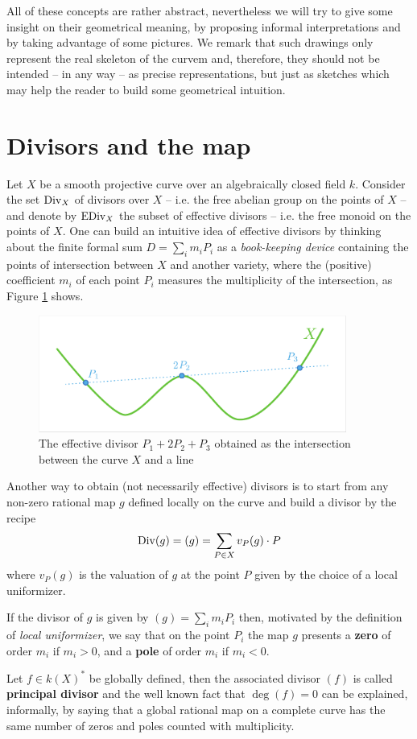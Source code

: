 All of these concepts are rather abstract, nevertheless we will try to give some insight on their geometrical meaning, by proposing informal interpretations and by taking advantage of some pictures.
We remark that such drawings only represent the real skeleton of the curvem and, therefore, they should not be intended -- in any way -- as precise representations, but just as sketches which may help the reader to build some geometrical intuition.

\section{Divisors and the \AJJ map}

	Let $X$ be a smooth projective curve over an algebraically closed field $k$. Consider the set $\operatorname{Div}_X$ of divisors over $X$ -- i.e. the free abelian group on the points of $X$ -- and denote by $\operatorname{EDiv}_X$ the subset of effective divisors -- i.e. the free monoid on the points of $X$. One can build an intuitive idea of effective divisors by thinking about the finite formal sum $D=\sum_i m_i P_i$ as a \emph{book-keeping device} containing the points of intersection between $X$ and another variety, where the (positive) coefficient $m_i$ of each point $P_i$ measures the multiplicity of the intersection, as Figure \ref{fig:Divisors} shows.

	\begin{figure}[h]
			\centering
			\includegraphics[width=0.9\textwidth]{Divisors.pdf}
			\caption{The effective divisor $P_1 + 2P_2 + P_3$ obtained as the intersection between the curve $X$ and a line}
			\label{fig:Divisors}
	\end{figure}

	Another way to obtain (not necessarily effective) divisors is to start from any non-zero rational map $g$ defined locally on the curve and build a divisor by the recipe
	$$ \operatorname{Div}(g) = (g) = \sum_{P\in X} v_P(g) \cdot P $$
	where $v_P(g)$ is the valuation of $g$ at the point $P$ given by the choice of a local uniformizer. 
	\begin{rema}
		If the divisor of $g$ is given by $(g)=\sum_i m_i P_i$ then, motivated by the definition of \emph{local uniformizer}, we say that on the point $P_i$ the map $g$ presents a \textbf{zero} of order $m_i$ if $m_i>0$, and a \textbf{pole} of order $m_i$ if $m_i<0$.
	\end{rema}	
	Let $f\in k(X)^*$ be globally defined, then the associated divisor $(f)$ is called \textbf{principal divisor} and the well known fact that $\deg(f)=0$ can be explained, informally, by saying that a global rational map on a complete curve has the same number of zeros and poles counted with multiplicity.\\

